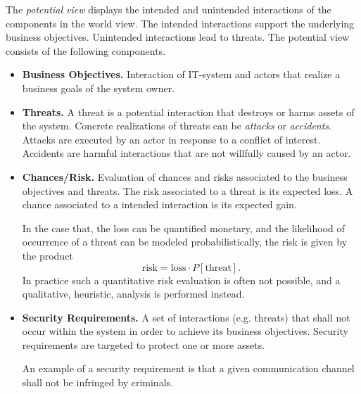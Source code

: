 The \emph{potential view} displays the intended and unintended interactions of the components in the world view.
The intended interactions support the underlying business objectives.
Unintended interactions lead to threats.
The potential view consists of the following components.
\begin{itemize}
\item \textbf{Business Objectives.}
Interaction of IT-system and actors that realize a business goals of the system owner.

\item \textbf{Threats.}
A threat is a potential interaction that destroys or harms assets of the system.
Concrete realizations of threats can be \emph{attacks} or \emph{accidents}.
Attacks are executed by an actor in response to a conflict of interest.
Accidents are harmful interactions that are not willfully caused by an actor.

\item \textbf{Chances/Risk.}
Evaluation of chances and risks associated to the business objectives and threats.
The risk associated to a threat is its expected loss.
A chance associated to a intended interaction is its expected gain.

In the case that, the loss can be quantified monetary, and the likelihood of occurrence of a threat can
be modeled probabilistically, the risk is given by the product
\[ \text{risk} = \text{loss} \cdot P[\text{threat}]. \]
In practice such a quantitative risk evaluation is often not possible, and a qualitative, heuristic, analysis is performed instead.

\item \textbf{Security Requirements.}
A set of interactions (e.g. threats) that shall not occur within the system in order to achieve its business objectives.
Security requirements are targeted to protect one or more assets.

An example of a security requirement is that a given communication channel shall not be infringed by criminals.
\end{itemize}




